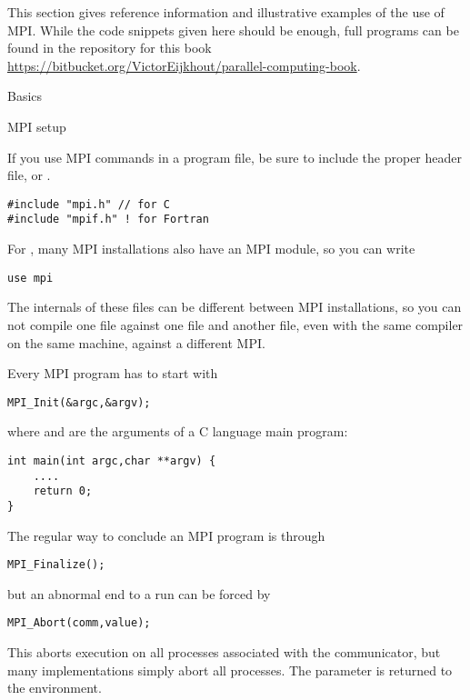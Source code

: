 
This section gives reference information and illustrative examples
of the use of MPI. While the code snippets given here should be enough,
full programs can be found in the repository for this book
\url{https://bitbucket.org/VictorEijkhout/parallel-computing-book}.

 {Basics}

 {MPI setup}

If you use MPI commands in a program file, be sure to include
the proper header file,  or .
\begin{verbatim}
#include "mpi.h" // for C
#include "mpif.h" ! for Fortran
\end{verbatim}
For , many MPI installations also have an MPI
module, so you can write
\begin{verbatim}
use mpi
\end{verbatim}
The internals of these files can be different between MPI
installations, so you can not compile one file against one 
file and another file, even with the same compiler on the same machine,
against a different MPI.

Every MPI program has to start with
\begin{verbatim}
MPI_Init(&argc,&argv);
\end{verbatim}
where  and  are the arguments
of a C language main program:
\begin{verbatim}
int main(int argc,char **argv) {
    ....
    return 0;
}
\end{verbatim}
The regular way to conclude an MPI program is through
\begin{verbatim}
MPI_Finalize();
\end{verbatim}
but an abnormal end to a run can be forced by
\begin{verbatim}
MPI_Abort(comm,value);
\end{verbatim}
This aborts execution on all processes associated with the communicator,
but many implementations simply abort all processes. The  parameter
is returned to the environment.

